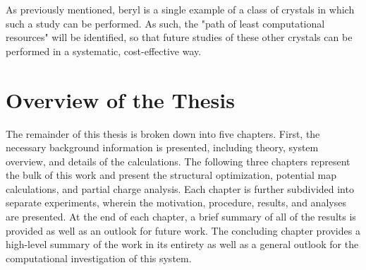 As previously mentioned, beryl is a single example of a class of crystals in which such a study can be performed. As such, the "path of least computational resources" will be identified, so that future studies of these other crystals can be performed in a systematic, cost-effective way. 

\section{Overview of the Thesis}
\label{overview}

The remainder of this thesis is broken down into five chapters. First, the necessary background information is presented, including theory, system overview, and details of the calculations. The following three chapters represent the bulk of this work and present the structural optimization, potential map calculations, and partial charge analysis. Each chapter is further subdivided into separate experiments, wherein the motivation, procedure, results, and analyses are presented. At the end of each chapter, a brief summary of all of the results is provided as well as an outlook for future work. The concluding chapter provides a high-level summary of the work in its entirety as well as a general outlook for the computational investigation of this system.